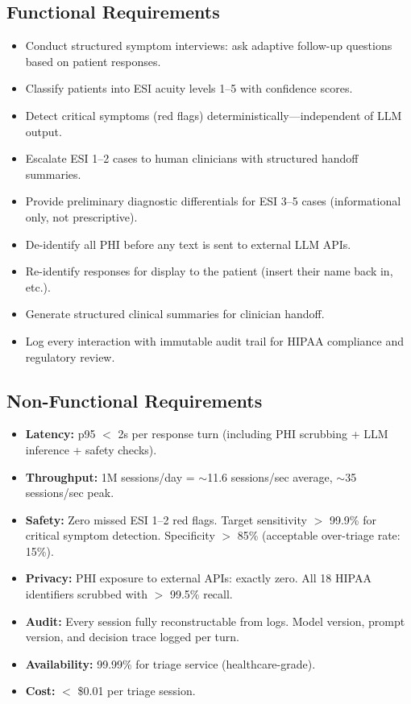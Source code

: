 \subsection*{Functional Requirements}
\begin{itemize}
  \item Conduct structured symptom interviews: ask adaptive follow-up questions based on patient responses.
  \item Classify patients into ESI acuity levels 1--5 with confidence scores.
  \item Detect critical symptoms (red flags) deterministically---independent of LLM output.
  \item Escalate ESI 1--2 cases to human clinicians with structured handoff summaries.
  \item Provide preliminary diagnostic differentials for ESI 3--5 cases (informational only, not prescriptive).
  \item De-identify all PHI before any text is sent to external LLM APIs.
  \item Re-identify responses for display to the patient (insert their name back in, etc.).
  \item Generate structured clinical summaries for clinician handoff.
  \item Log every interaction with immutable audit trail for HIPAA compliance and regulatory review.
\end{itemize}

\subsection*{Non-Functional Requirements}
\begin{itemize}
  \item \textbf{Latency:} p95 $<$ 2s per response turn (including PHI scrubbing + LLM inference + safety checks).
  \item \textbf{Throughput:} 1M sessions/day = $\sim$11.6 sessions/sec average, $\sim$35 sessions/sec peak.
  \item \textbf{Safety:} Zero missed ESI 1--2 red flags. Target sensitivity $>$ 99.9\% for critical symptom detection. Specificity $>$ 85\% (acceptable over-triage rate: 15\%).
  \item \textbf{Privacy:} PHI exposure to external APIs: exactly zero. All 18 HIPAA identifiers scrubbed with $>$ 99.5\% recall.
  \item \textbf{Audit:} Every session fully reconstructable from logs. Model version, prompt version, and decision trace logged per turn.
  \item \textbf{Availability:} 99.99\% for triage service (healthcare-grade).
  \item \textbf{Cost:} $<$ \$0.01 per triage session.
\end{itemize}


